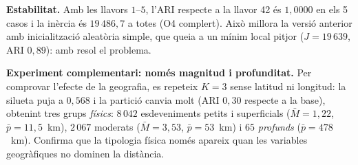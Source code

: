 \documentclass[a4paper,11pt]{article}
\providecommand{\py}[1]{\texttt{\detokenize{#1}}}
\begin{document}
\textbf{Estabilitat.} Amb les llavors $1$--$5$, l'ARI respecte a la llavor 42 és $1{,}0000$ en els 5 casos i la inèrcia és $19\,486{,}7$ a totes (O4 complert). Això millora la versió anterior amb inicialització aleatòria simple, que queia a un mínim local pitjor ($J=19\,639$, ARI $0{,}89$): \py{k-means++} amb \py{n_init=10} resol el problema.

\textbf{Experiment complementari: només magnitud i profunditat.} Per comprovar l'efecte de la geografia, es repeteix $K=3$ sense latitud ni longitud: la silueta puja a $0{,}568$ i la partició canvia molt (ARI $0{,}30$ respecte a la base), obtenint tres grups \emph{físics}: $8\,042$ esdeveniments petits i superficials ($\bar M=1{,}22$, $\bar p=11{,}5$~km), $2\,067$ moderats ($\bar M=3{,}53$, $\bar p=53$~km) i $65$ \emph{profunds} ($\bar p=478$~km). Confirma que la tipologia física només apareix quan les variables geogràfiques no dominen la distància.
\end{document}

